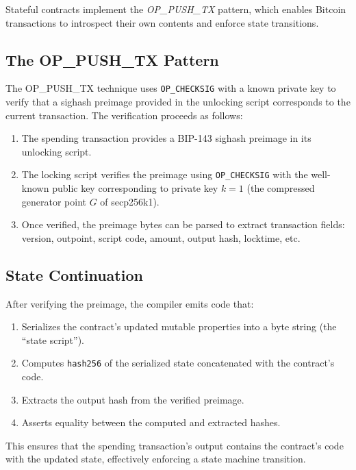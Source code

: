 \documentclass[11pt,a4paper]{article}
\newcommand{\op}[1]{\texttt{OP\_#1}}
\begin{document}
Stateful contracts implement the \emph{OP\_PUSH\_TX} pattern, which enables
Bitcoin transactions to introspect their own contents and enforce state
transitions.

\subsection{The OP\_PUSH\_TX Pattern}
\label{sec:push-tx}

The OP\_PUSH\_TX technique uses \op{CHECKSIG} with a known private key to
verify that a sighash preimage provided in the unlocking script corresponds
to the current transaction. The verification proceeds as follows:

\begin{enumerate}[nosep]
  \item The spending transaction provides a BIP-143 sighash preimage in its
    unlocking script.
  \item The locking script verifies the preimage using \op{CHECKSIG} with
    the well-known public key corresponding to private key $k = 1$ (the
    compressed generator point $G$ of secp256k1).
  \item Once verified, the preimage bytes can be parsed to extract
    transaction fields: version, outpoint, script code, amount, output hash,
    locktime, etc.
\end{enumerate}

\subsection{State Continuation}
\label{sec:state-continuation}

After verifying the preimage, the compiler emits code that:
\begin{enumerate}[nosep]
  \item Serializes the contract's updated mutable properties into a
    byte string (the ``state script'').
  \item Computes \texttt{hash256} of the serialized state concatenated
    with the contract's code.
  \item Extracts the output hash from the verified preimage.
  \item Asserts equality between the computed and extracted hashes.
\end{enumerate}

This ensures that the spending transaction's output contains the contract's
code with the updated state, effectively enforcing a state machine transition.
\end{document}
